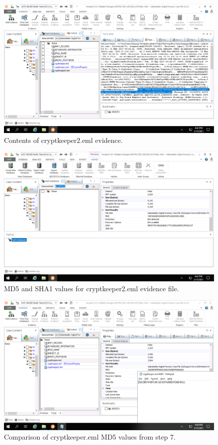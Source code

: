 \begin{figure}[H]
    \centering
    \includegraphics[width=\linewidth]{figures/2-10.png}
    \caption{Contents of cryptkeeper2.eml evidence.}
\end{figure}

\begin{figure}[H]
    \centering
    \includegraphics[width=\linewidth]{figures/2-11.png}
    \caption{MD5 and SHA1 values for cryptkeeper2.eml evidence file.}
\end{figure}

\begin{figure}[H]
    \centering
    \includegraphics[width=\linewidth]{figures/2-12.png}
    \caption{Comparison of cryptkeeper.eml MD5 values from step 7.}
\end{figure}

